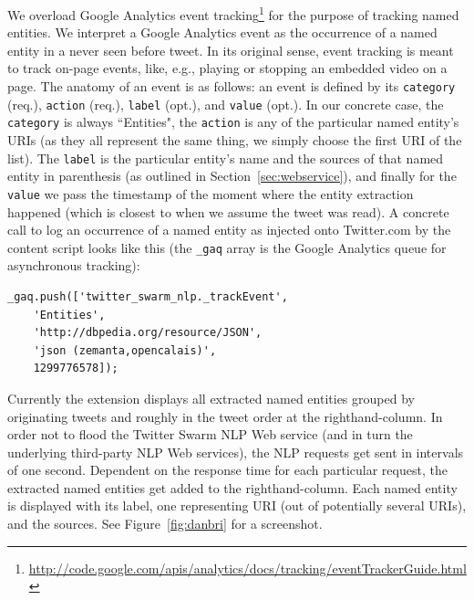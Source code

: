 \documentclass[runningheads,a4paper]{llncs}
\begin{document}
We overload Google Analytics event tracking\footnote{\url{http://code.google.com/apis/analytics/docs/tracking/eventTrackerGuide.html}} for the purpose of tracking named entities. We interpret a Google Analytics event as the occurrence of a named entity in a never seen before tweet. In its original sense, event tracking is meant to track on-page events, like, e.g., playing or stopping an embedded video on a page. The anatomy of an event is as follows: an event is defined by its \texttt{category} (req.), \texttt{action} (req.), \texttt{label} (opt.), and \texttt{value} (opt.). In our concrete case, the \texttt{category} is always ``Entities", the \texttt{action} is any of the particular named entity's URIs (as they all represent the same thing, we simply choose the first URI of the list). The \texttt{label} is the particular entity's name and the sources of that named entity in parenthesis (as outlined in Section~\ref{sec:webservice}), and finally for the \texttt{value} we pass the timestamp of the moment where the entity extraction happened (which is closest to when we assume the tweet was read). A concrete call to log an occurrence of a named entity as injected onto Twitter.com by the content script looks like this (the \texttt{\_gaq} array is the Google Analytics queue for asynchronous tracking):

\begin{lstlisting}
_gaq.push(['twitter_swarm_nlp._trackEvent',
    'Entities',
    'http://dbpedia.org/resource/JSON',
    'json (zemanta,opencalais)',
    1299776578]);
\end{lstlisting}

Currently the extension displays all extracted named entities grouped by originating tweets and roughly in the tweet order at the righthand-column. In order not to flood the Twitter Swarm NLP Web service (and in turn the underlying third-party NLP Web services), the NLP requests get sent in intervals of one second. Dependent on the response time for each particular request, the extracted named entities get added to the righthand-column. Each named entity is displayed with its label, one representing URI (out of potentially several URIs), and the sources. See Figure~\ref{fig:danbri} for a screenshot.
\end{document}
